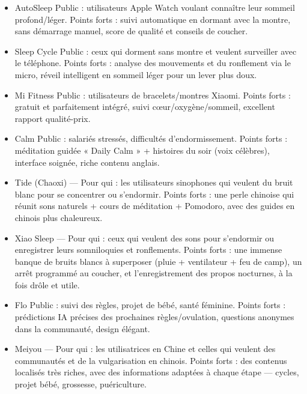 
\begin{itemize}
  \item AutoSleep Public : utilisateurs Apple Watch voulant connaître leur sommeil profond/léger. Points forts : suivi automatique en dormant avec la montre, sans démarrage manuel, score de qualité et conseils de coucher.
  \item Sleep Cycle Public : ceux qui dorment sans montre et veulent surveiller avec le téléphone. Points forts : analyse des mouvements et du ronflement via le micro, réveil intelligent en sommeil léger pour un lever plus doux.
  \item Mi Fitness Public : utilisateurs de bracelets/montres Xiaomi. Points forts : gratuit et parfaitement intégré, suivi cœur/oxygène/sommeil, excellent rapport qualité-prix.
\end{itemize}


\begin{itemize}
  \item Calm Public : salariés stressés, difficultés d'endormissement. Points forts : méditation guidée « Daily Calm » + histoires du soir (voix célèbres), interface soignée, riche contenu anglais.
  \item Tide (Chaoxi) — Pour qui : les utilisateurs sinophones qui veulent du bruit blanc pour se concentrer ou s'endormir. Points forts : une perle chinoise qui réunit sons naturels + cours de méditation + Pomodoro, avec des guides en chinois plus chaleureux.
  \item Xiao Sleep — Pour qui : ceux qui veulent des sons pour s'endormir ou enregistrer leurs somniloquies et ronflements. Points forts : une immense banque de bruits blancs à superposer (pluie + ventilateur + feu de camp), un arrêt programmé au coucher, et l'enregistrement des propos nocturnes, à la fois drôle et utile.
\end{itemize}


\begin{itemize}
  \item Flo Public : suivi des règles, projet de bébé, santé féminine. Points forts : prédictions IA précises des prochaines règles/ovulation, questions anonymes dans la communauté, design élégant.
  \item Meiyou — Pour qui : les utilisatrices en Chine et celles qui veulent des communautés et de la vulgarisation en chinois. Points forts : des contenus localisés très riches, avec des informations adaptées à chaque étape — cycles, projet bébé, grossesse, puériculture.
\end{itemize}

